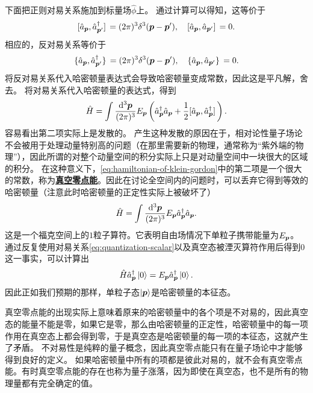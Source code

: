 \documentclass[hyperref, UTF8, a4paper]{ctexart}
\newcommand{\concept}[1]{\underline{\textbf{#1}}}
\begin{document}
下面把正则对易关系施加到标量场$\hat{\phi}$上。
通过计算可以得知，这等价于
\begin{equation}
    \comm*{\hat{a}_{\vb*{p}}}{\hat{a}^\dagger_{\vb*{p}'}} = (2\pi)^3 \delta^3 (\vb*{p} - \vb*{p}'), \quad \comm*{\hat{a}_{\vb*{p}}}{\hat{a}_{\vb*{p}'}} = 0.
    \label{eq:quantization-scalar}
\end{equation}
相应的，反对易关系等价于
\[
    \acomm*{\hat{a}_{\vb*{p}}}{\hat{a}^\dagger_{\vb*{p}'}} = (2\pi)^3 \delta^3 (\vb*{p} - \vb*{p}'), \quad \acomm*{\hat{a}_{\vb*{p}}}{\hat{a}_{\vb*{p}'}} = 0.
\]
将反对易关系代入哈密顿量表达式会导致哈密顿量变成常数，因此这是平凡解，舍去。
将对易关系代入哈密顿量的表达式，得到
\begin{equation}
    \hat{H} = \int \frac{\dd[3]{\vb*{p}}}{(2\pi)^3} E_{\vb*{p}} \left(\hat{a}_{\vb*{p}}^\dagger \hat{a}_{\vb*{p}}  + \frac{1}{2} \comm*{\hat{a}_{\vb*{p}}}{\hat{a}^\dagger_{\vb*{p}}} \right).
    \label{eq:hamiltonian-of-klein-gordon}
\end{equation}
容易看出第二项实际上是发散的。
产生这种发散的原因在于，相对论性量子场论不会被用于处理动量特别高的问题（在那里需要新的物理，通常称为“紫外端的物理”），因此所谓的对整个动量空间的积分实际上只是对动量空间中一块很大的区域的积分。
在这种意义下，\eqref{eq:hamiltonian-of-klein-gordon}中的第二项是一个很大的常数，称为\concept{真空零点能}。因此在讨论全空间内的问题时，可以丢弃它得到等效的哈密顿量（注意此时哈密顿量的正定性实际上被破坏了）%
\begin{equation}
    \hat{H} = \int \frac{\dd[3]{\vb*{p}}}{(2\pi)^3} E_{\vb*{p}} \hat{a}_{\vb*{p}}^\dagger \hat{a}_{\vb*{p}}.
\end{equation}
这是一个福克空间上的$1$粒子算符。它表明自由场情况下单粒子携带能量为$E_{\vb*{p}}$。
通过反复使用对易关系\eqref{eq:quantization-scalar}以及真空态被湮灭算符作用后得到$0$这一事实，可以计算出
\begin{equation}
    \hat{H} \hat{a}_{\vb*{p}}^\dagger \ket{0} = E_{\vb*{p}} \hat{a}_{\vb*{p}}^\dagger \ket{0}.
\end{equation}
因此正如我们预期的那样，单粒子态$\ket{\vb*{p}}$是哈密顿量的本征态。

真空零点能的出现实际上意味着原来的哈密顿量中的各个项是不对易的，因此真空态的能量不能是零，如果它是零，那么由哈密顿量的正定性，哈密顿量中的每一项作用在真空态上都会得到零，于是真空态是哈密顿量的每一项的本征态，这就产生了矛盾。
不对易性是纯粹的量子概念，因此真空零点能只有在量子场论中才能够得到良好的定义。
如果哈密顿量中所有的项都是彼此对易的，就不会有真空零点能。有时真空零点能的存在也称为量子涨落，因为即使在真空态，也不是所有的物理量都有完全确定的值。
\end{document}
